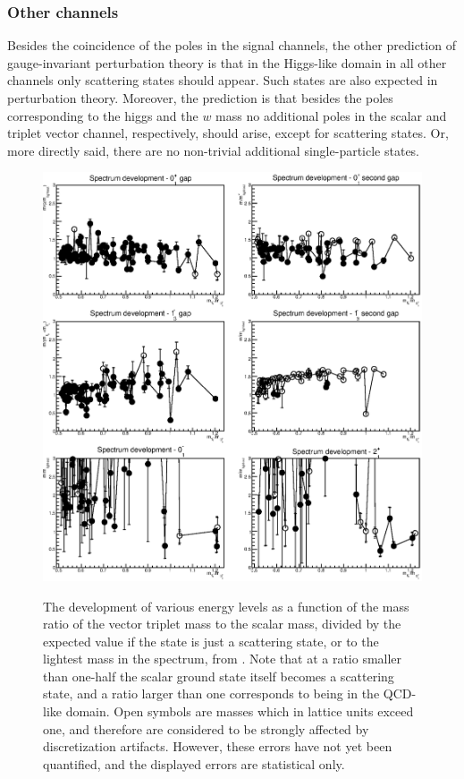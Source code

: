 \documentclass[final,12pt]{article}
\newcommand*{\1}{1\!\!\!\bot}
\begin{document}
\subsubsection{Other channels}\label{sss:other}

Besides the coincidence of the poles in the signal channels, the other prediction of gauge-invariant perturbation theory is that in the Higgs-like domain in all other channels only scattering states should appear. Such states are also expected in perturbation theory. Moreover, the prediction is that besides the poles corresponding to the higgs and the $w$ mass no additional poles in the scalar and triplet vector channel, respectively, should arise, except for scattering states. Or, more directly said, there are no non-trivial additional single-particle states.

\begin{figure}
\includegraphics[width=\linewidth]{spectrum}\\
\caption{\label{fig:spectrum}The development of various energy levels as a function of the mass ratio of the vector triplet mass to the scalar mass, divided by the expected value if the state is just a scattering state, or to the lightest mass in the spectrum, from \cite{Maas:2014pba,Maas:unpublished}. Note that at a ratio smaller than one-half the scalar ground state itself becomes a scattering state, and a ratio larger than one corresponds to being in the QCD-like domain. Open symbols are masses which in lattice units exceed one, and therefore are considered to be strongly affected by discretization artifacts. However, these errors have not yet been quantified, and the displayed errors are statistical only.}
\end{figure}
\end{document}
